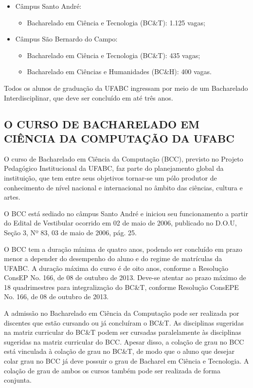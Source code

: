 \begin{itemize}
	\item Câmpus Santo André:
	\begin{itemize}
		\item Bacharelado em Ciência e Tecnologia (BC\&T): 1.125 vagas;
	\end{itemize}
	\item Câmpus São Bernardo do Campo:
	\begin{itemize}
		\item Bacharelado em Ciência e Tecnologia (BC\&T): 435 vagas;
		\item Bacharelado em Ciências e Humanidades (BC\&H): 400 vagas.
	\end{itemize}
\end{itemize}

Todos os alunos de graduação da UFABC ingressam por meio de um Bacharelado Interdisciplinar, que deve ser concluído em até três anos.


\subsection{O CURSO DE BACHARELADO EM CIÊNCIA DA COMPUTAÇÃO DA UFABC}

O curso de Bacharelado em Ciência da Computação (BCC), previsto no Projeto Pedagógico Institucional da UFABC, faz parte do planejamento global da instituição, que tem entre seus objetivos tornar-se um pólo produtor de conhecimento de nível nacional e internacional  no âmbito das ciências, cultura e artes.

O BCC está sediado no câmpus Santo André e iniciou seu funcionamento a partir do Edital de Vestibular ocorrido em 02 de maio de 2006, publicado no D.O.U, Seção 3, Nº 83, 03 de maio de 2006, pág. 25.

O BCC tem a duração mínima de quatro anos, podendo ser concluído em prazo menor a depender do desempenho do aluno e do regime de matrículas da UFABC. A duração máxima do curso é de oito anos, conforme a Resolução ConsEP No. 166, de 08 de outubro de 2013. Deve-se atentar ao prazo máximo de 18 quadrimestres para integralização do BC\&T, conforme Resolução ConsEPE No. 166, de 08 de outubro de 2013.

A admissão no Bacharelado em Ciência da Computação pode ser realizada por discentes que estão cursando ou já concluíram o BC\&T. As disciplinas sugeridas na matriz curricular do BC\&T podem ser cursadas paralelamente às disciplinas sugeridas na matriz curricular do BCC. Apesar disso, a colação de grau no BCC está vinculada à colação de grau no BC\&T, de modo que o aluno que desejar colar grau no BCC já deve possuir o grau de Bacharel em Ciência e Tecnologia.  A colação de grau de ambos os cursos também pode ser realizada de forma conjunta.

